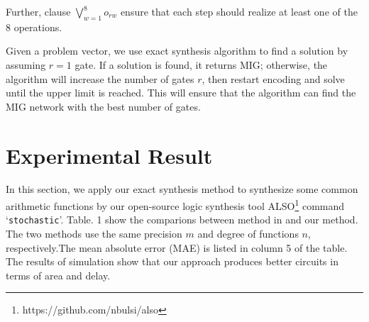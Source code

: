 \documentclass[conference,letterpaper]{IEEEtran}
\begin{document}
Further, clause $\bigvee_{w=1}^{8} o_{r w}$ ensure that each step should realize at least one of the 8 operations.

Given a problem vector, we use exact synthesis algorithm to find a solution by assuming $r= 1$ gate. If a solution is found, it returns MIG; otherwise, the algorithm will increase the number of gates $r$, then restart encoding and solve until the upper limit is reached. This will ensure that the algorithm can find the MIG network with the best number of gates.


\section*{Experimental Result}
In this section, we apply our exact synthesis method to synthesize some common arithmetic functions by our open-source logic synthesis tool ALSO\footnote{https://github.com/nbulsi/also} command `\texttt{stochastic}'. Table. 1 show the comparions between method in\cite{2} and our method.
The two methods use the same precision $m$ and degree of functions $n$, respectively.The mean absolute error (MAE) is listed in column 5 of the table. The results of simulation show that our approach produces better circuits in terms of area and delay.
\end{document}
